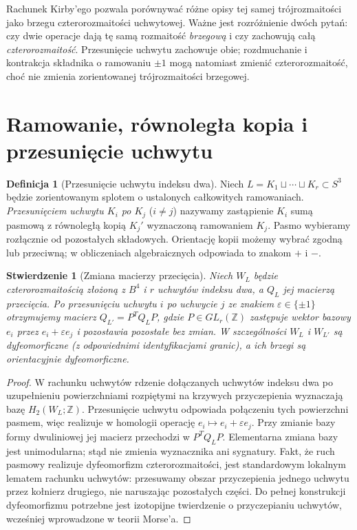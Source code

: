 \documentclass[11pt,a4paper]{report}
\numberwithin{equation}{section}
\theoremstyle{plain}
\newtheorem{stwierdzenie}[twierdzenie]{Stwierdzenie}
\theoremstyle{definition}
\newtheorem{definicja}[twierdzenie]{Definicja}
\theoremstyle{remark}
\begin{document}
Rachunek Kirby'ego pozwala porównywać różne opisy
tej samej trójrozmaitości jako brzegu czterorozmaitości
uchwytowej. Ważne jest rozróżnienie dwóch pytań:
czy dwie operacje dają tę samą rozmaitość \emph{brzegową}
i czy zachowują całą \emph{czterorozmaitość}.
Przesunięcie uchwytu zachowuje obie;
rozdmuchanie i kontrakcja składnika o ramowaniu $\pm1$
mogą natomiast zmienić czterorozmaitość,
choć nie zmienia zorientowanej trójrozmaitości brzegowej.

\section{Ramowanie, równoległa kopia i przesunięcie uchwytu}
\label{sec:tg-kirby-slides}

\begin{definicja}[Przesunięcie uchwytu indeksu dwa]
Niech $L=K_1\sqcup\cdots\sqcup K_r\subset S^3$
będzie zorientowanym splotem o ustalonych całkowitych
ramowaniach. \emph{Przesunięciem uchwytu $K_i$ po $K_j$}
($i\ne j$) nazywamy zastąpienie $K_i$ sumą pasmową
z równoległą kopią $K_j'$ wyznaczoną ramowaniem $K_j$.
Pasmo wybieramy rozłącznie od pozostałych składowych.
Orientację kopii możemy wybrać zgodną lub przeciwną;
w obliczeniach algebraicznych odpowiada to znakom $+$ i $-$.
\end{definicja}

\begin{stwierdzenie}[Zmiana macierzy przecięcia]
\label{prop:tg-kirby-congruence}
Niech $W_L$ będzie czterorozmaitością złożoną z $B^4$
i $r$ uchwytów indeksu dwa, a $Q_L$ jej macierzą przecięcia.
Po przesunięciu uchwytu $i$ po uchwycie $j$ ze znakiem
$\varepsilon\in\{\pm1\}$ otrzymujemy macierz
$Q_{L'}=P^TQ_LP$, gdzie $P\in GL_r(\mathbb Z)$
zastępuje wektor bazowy $e_i$ przez
$e_i+\varepsilon e_j$ i pozostawia pozostałe bez zmian.
W szczególności $W_L$ i $W_{L'}$ są dyfeomorficzne
(z odpowiednimi identyfikacjami granic), a ich brzegi
są orientacyjnie dyfeomorficzne.
\end{stwierdzenie}

\begin{proof}
W rachunku uchwytów rdzenie dołączanych uchwytów indeksu dwa
po uzupełnieniu powierzchniami rozpiętymi na krzywych
przyczepienia wyznaczają bazę $H_2(W_L;\mathbb Z)$.
Przesunięcie uchwytu odpowiada połączeniu tych powierzchni
pasmem, więc realizuje w homologii operację
$e_i\mapsto e_i+\varepsilon e_j$.
Przy zmianie bazy formy dwuliniowej jej macierz
przechodzi w $P^TQ_LP$. Elementarna zmiana bazy
jest unimodularna; stąd nie zmienia wyznacznika ani
sygnatury. Fakt, że ruch pasmowy realizuje dyfeomorfizm
czterorozmaitości, jest standardowym lokalnym lematem
rachunku uchwytów: przesuwamy obszar przyczepienia
jednego uchwytu przez kołnierz drugiego, nie naruszając
pozostałych części. Do pełnej konstrukcji dyfeomorfizmu
potrzebne jest izotopijne twierdzenie o przyczepianiu
uchwytów, wcześniej wprowadzone w teorii Morse'a.
\end{proof}
\end{document}
